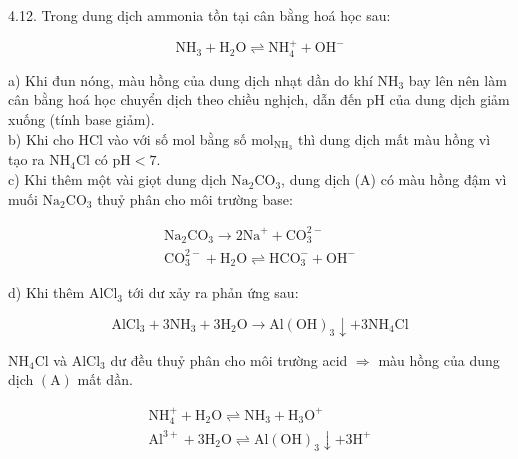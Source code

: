 \documentclass[10pt]{article}
\begin{document}
4.12. Trong dung dịch ammonia tồn tại cân bằng hoá học sau:

$$
\mathrm{NH}_{3}+\mathrm{H}_{2} \mathrm{O} \rightleftharpoons \mathrm{NH}_{4}^{+}+\mathrm{OH}^{-}
$$

a) Khi đun nóng, màu hồng của dung dịch nhạt dần do khí $\mathrm{NH}_{3}$ bay lên nên làm cân bằng hoá học chuyển dịch theo chiều nghịch, dẫn đến pH của dung dịch giảm xuống (tính base giảm).\\
b) Khi cho HCl vào với số mol bằng số $\mathrm{mol}_{\mathrm{NH}_{3}}$ thì dung dịch mất màu hồng vì tạo ra $\mathrm{NH}_{4} \mathrm{Cl}$ có $\mathrm{pH}<7$.\\
c) Khi thêm một vài giọt dung dịch $\mathrm{Na}_{2} \mathrm{CO}_{3}$, dung dịch (A) có màu hồng đậm vì muối $\mathrm{Na}_{2} \mathrm{CO}_{3}$ thuỷ phân cho môi trường base:

$$
\begin{gathered}
\mathrm{Na}_{2} \mathrm{CO}_{3} \rightarrow 2 \mathrm{Na}^{+}+\mathrm{CO}_{3}^{2-} \\
\mathrm{CO}_{3}^{2-}+\mathrm{H}_{2} \mathrm{O} \rightleftharpoons \mathrm{HCO}_{3}^{-}+\mathrm{OH}^{-}
\end{gathered}
$$

d) Khi thêm $\mathrm{AlCl}_{3}$ tới dư xảy ra phản ứng sau:

$$
\mathrm{AlCl}_{3}+3 \mathrm{NH}_{3}+3 \mathrm{H}_{2} \mathrm{O} \rightarrow \mathrm{Al}(\mathrm{OH})_{3} \downarrow+3 \mathrm{NH}_{4} \mathrm{Cl}
$$

$\mathrm{NH}_{4} \mathrm{Cl}$ và $\mathrm{AlCl}_{3}$ dư đều thuỷ phân cho môi trường acid $\Rightarrow$ màu hồng của dung dịch $(\mathrm{A})$ mất dần.

$$
\begin{gathered}
\mathrm{NH}_{4}^{+}+\mathrm{H}_{2} \mathrm{O} \rightleftharpoons \mathrm{NH}_{3}+\mathrm{H}_{3} \mathrm{O}^{+} \\
\mathrm{Al}^{3+}+3 \mathrm{H}_{2} \mathrm{O} \rightleftharpoons \mathrm{Al}(\mathrm{OH})_{3} \downarrow+3 \mathrm{H}^{+}
\end{gathered}
$$
\end{document}
